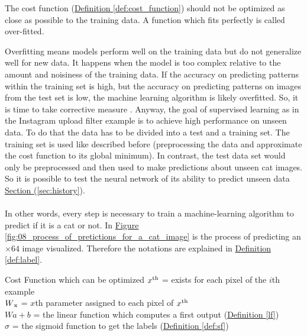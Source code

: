 The cost function (\hyperref[def:cost_function]{Definition \ref{def:cost_function}}) should not be optimized as close as possible to the training data. A function which fits perfectly is called over-fitted. 

Overfitting means models perform well on the training data but do not generalize well for new data. It happens when the model is too complex relative to the amount and noisiness of the training data. If the accuracy on predicting patterns within the training set is high, but the accuracy on predicting patterns on images from the test set is low, the machine learning algorithm is likely overfitted. So, it is time to take corrective measure \cite[p. 110]{Goodfellow-et-al-2016}. Anyway, the goal of supervised learning as in the Instagram upload filter example is to achieve high performance on unseen data. To do that the data has to be divided into a test and a training set. The training set is used like described before (preprocessing the data and approximate the cost function to its global minimum). In contrast, the test data set would only be preprocessed and then used to make predictions about unseen cat images. So it is possible to test the neural network of its ability to predict unseen data \hyperref[sec:history]{Section (\ref{sec:history}}).\\\\

In other words, every step is necessary to train a machine-learning algorithm to predict if it is a cat or not. In  \hyperref[fig:08_process_of_pretictions_for_a_cat_image]{Figure \ref{fig:08_process_of_pretictions_for_a_cat_image}} is the process of predicting an \(\times64 \) image visualized. Therefore the notations are explained in \hyperref[def:label]{Definition \ref{def:label}}.

\begin{definition}[label=def:label]{Cost Function which can be optimized}
	\(x\textsuperscript{th} \) = exists for each pixel of the \(i\)th example \\
	\( W\textsubscript{x} \) = \(x\)th parameter assigned to each pixel of \(x\textsuperscript{th}\) \\
	\( W a + b\) = the linear function which computes a first output (\hyperref[lf]{Definition \ref{lf}}) \\
	\( \sigma \) = the sigmoid function to get the labels  (\hyperref[def:sf]{Definition \ref{def:sf}})
\end{definition}



